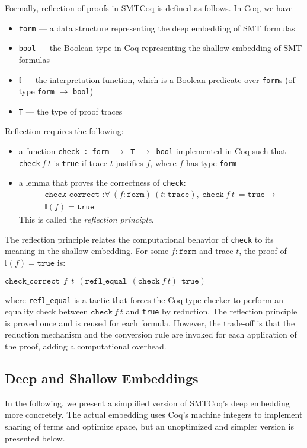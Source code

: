 \documentclass{article}
\begin{document}
	Formally, reflection of proofs 
	in SMTCoq is defined as follows. 
	In Coq, we have 
	\begin{itemize}
		\item \texttt{form} --- a data 
		structure representing the deep 
		embedding of SMT formulas
		\item \texttt{bool} --- the 
		Boolean type in Coq 
		representing the shallow 
		embedding of SMT formulas
		\item $\mathbb{I}$ --- the 
		interpretation function, which 
		is a Boolean predicate over 
		\texttt{form}s (of type 
		\texttt{form} $\to$ 
		\texttt{bool})
		\item \texttt{T} --- the type of 
		proof traces
	\end{itemize}
	Reflection requires the following:
	\begin{itemize}
		\item a function 
		\texttt{check : form $\to$ T $\to$ 
		bool} implemented in Coq such that 
		\texttt{check}$\ f\ t$ is 
		\texttt{true} if trace $t$
		justifies $f$,
		where $f$ has type 
		\texttt{form}
		\item a lemma that proves the 
		correctness of \texttt{check}:
		\begin{align*}
			\texttt{check\_correct :} 
			\forall\ (f : \texttt{form})\ 
			(t : \texttt{trace}),\ 
			\texttt{check}\ f\ t\ = 
			\texttt{true} \to \\
			\mathbb{I}(f) = 
			\texttt{true}
		\end{align*}
		This is called the 
		\textit{reflection principle}.
	\end{itemize}
	The reflection principle relates 
	the computational behavior of 
	\texttt{check} to its meaning
	in the shallow embedding. For some 
	$f : \texttt{form}$ and trace $t$, 
	the proof of $\mathbb{I}(f) = 
	\texttt{true}$ is:
	\begin{center}
		$\texttt{check\_correct}\ \ 
		f\ \ t\ \ (\texttt{refl\_equal}\ \ 
		(\texttt{check}\ f\ t)\ \ 
		\texttt{true})$
	\end{center}
	where \texttt{refl\_equal} is a tactic
	that forces the Coq type checker to 
	perform an equality check between 
	$\texttt{check}\ f\ t$ and \texttt{true}
	by reduction. The reflection principle 
	is proved once and is reused for 
	each formula. However, the trade-off is 
	that the reduction mechanism and the 
	conversion rule are invoked for each 
	application of the proof, adding a 
	computational overhead. 
	
	\subsection{Deep and Shallow Embeddings}
	In the following, we present 
	a simplified version of SMTCoq's 
	deep embedding more concretely. 
	The actual embedding uses Coq's 
	machine integers to implement 
	sharing of terms and optimize 
	space, but an unoptimized and 
	simpler version is presented 
	below. 
	
\end{document}
